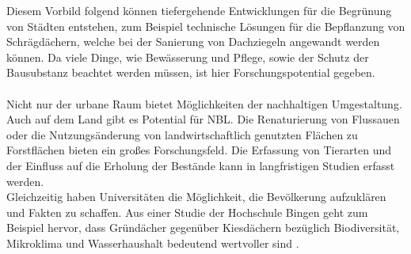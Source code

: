   Diesem Vorbild folgend können tiefergehende Entwicklungen für die Begrünung von Städten entstehen, zum Beispiel technische Lösungen für die Bepflanzung von Schrägdächern, welche bei der Sanierung von Dachziegeln angewandt werden können. Da viele Dinge, wie Bewässerung und Pflege, sowie der Schutz der Bausubstanz beachtet werden müssen, ist hier Forschungspotential gegeben.\\\\
  Nicht nur der urbane Raum bietet Möglichkeiten der nachhaltigen Umgestaltung. Auch auf dem Land gibt es Potential für NBL. Die Renaturierung von Flussauen oder die Nutzungsänderung von landwirtschaftlich genutzten Flächen zu Forstflächen bieten ein großes Forschungsfeld. Die Erfassung von Tierarten und der Einfluss auf die Erholung der Bestände kann in langfristigen Studien erfasst werden.\\
  Gleichzeitig haben Universitäten die Möglichkeit, die Bevölkerung aufzuklären und Fakten zu schaffen. Aus einer Studie der Hochschule Bingen geht zum Beispiel hervor, dass Gründächer gegenüber Kiesdächern bezüglich Biodiversität, Mikroklima und Wasserhaushalt bedeutend wertvoller sind \cite{hietel_extensive_2016}.
